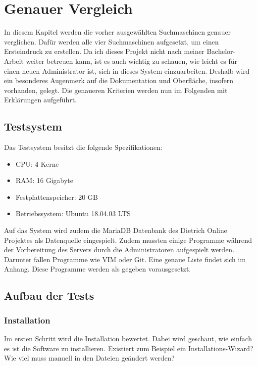 \chapter{Genauer Vergleich}

In diesem Kapitel werden die vorher ausgewählten Suchmaschinen genauer verglichen. Dafür werden alle vier Suchmaschinen aufgesetzt, um einen Ersteindruck zu erstellen. Da ich dieses Projekt nicht nach meiner Bachelor-Arbeit weiter betreuen kann, ist es auch wichtig zu schauen, wie leicht  es für einen neuen Administrator ist, sich in dieses System einzuarbeiten. Deshalb wird ein besonderes Augenmerk auf die Dokumentation und Oberfläche, insofern vorhanden, gelegt. Die genaueren Kriterien werden nun im Folgenden mit Erklärungen aufgeführt.

\section{Testsystem}
Das Testsystem besitzt die folgende Spezifikationen:

\begin{itemize}
    \item CPU: 4 Kerne
    \item RAM: 16 Gigabyte
    \item Festplattenspeicher: 20 GB
    \item Betriebssystem: Ubuntu 18.04.03 LTS
\end{itemize} 

Auf das System wird zudem die MariaDB Datenbank des Dietrich Online Projektes als Datenquelle eingespielt. Zudem mussten einige Programme während der Vorbereitung des Servers durch die Administratoren aufgespielt werden. Darunter fallen Programme wie VIM oder Git. Eine genaue Liste findet sich im Anhang. Diese Programme werden als gegeben vorausgesetzt.

\section{Aufbau der Tests}

\subsection{Installation}

Im ersten Schritt wird die Installation bewertet. Dabei wird geschaut, wie einfach es ist die Software zu installieren. Existiert zum Beispiel ein Installations-Wizard? Wie viel muss manuell in den Dateien geändert werden?

